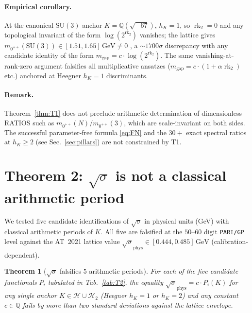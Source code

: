 \documentclass[aps,prl,reprint,superscriptaddress,floatfix,nofootinbib,amssymb]{revtex4-2}
\newtheorem{theorem}{Theorem}
\theoremstyle{definition}
\theoremstyle{remark}
\DeclareMathOperator{\rk}{rk}
\newcommand{\Q}{\mathbb{Q}}
\begin{document}
\paragraph{Empirical corollary.}
At the canonical $\mathrm{SU}(3)$ anchor $K = \Q(\sqrt{-67})$,
$h_K=1$, so $\rk_2 = 0$ and any topological invariant of the form
$\log(2^{\rk_2})$ vanishes; the lattice gives
$m_{0^{++}}(\mathrm{SU}(3)) \in [1.51, 1.65]\, \mathrm{GeV} \ne 0$
\cite{AthenodorouTeper2021}, a $\sim 1700\sigma$ discrepancy with any
candidate identity of the form $m_{\text{gap}} = c \cdot
\log(2^{\rk_2})$. The same vanishing-at-rank-zero argument falsifies
all multiplicative ansatzes ($m_{\text{gap}} = c \cdot (1 + \alpha
\rk_2)$ etc.) anchored at Heegner $h_K=1$ discriminants.

\paragraph{Remark.}
Theorem~\ref{thm:T1} does not preclude arithmetic determination of
dimensionless RATIOS such as $m_{0^{++}}(N)/m_{0^{++}}(3)$, which are
scale-invariant on both sides. The successful parameter-free formula
\eqref{eq:FN} and the $30+$ exact spectral ratios at $h_K \ge 2$
(see Sec.~\ref{sec:pillars}) are not constrained by T1.

\section{Theorem 2: $\sqrt{\sigma}$ is not a classical arithmetic
period}\label{sec:T2}

We tested five candidate identifications of $\sqrt{\sigma}$ in
physical units (GeV) with classical arithmetic periods of $K$. All
five are falsified at the $50$--$60$ digit \texttt{PARI/GP} level
against the AT~2021 lattice value $\sqrt{\sigma}_{\mathrm{phys}} \in
[0.444, 0.485]\,\mathrm{GeV}$ (calibration-dependent).

\begin{theorem}[$\sqrt{\sigma}$ falsifies 5 arithmetic periods]
\label{thm:T2}
For each of the five candidate functionals $P_i$ tabulated in
Tab.~\ref{tab:T2}, the equality $\sqrt{\sigma}_{\mathrm{phys}} = c
\cdot P_i(K)$ for any single anchor $K \in \mathcal H \cup \mathcal
H_2$ (Heegner $h_K=1$ or $h_K=2$) and any constant $c\in\Q$ fails by
more than two standard deviations against the lattice envelope.
\end{theorem}
\end{document}
